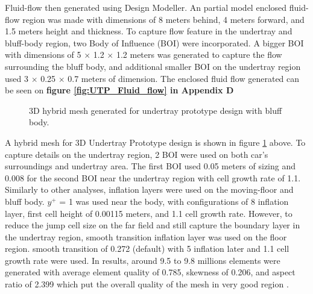  \noindent Fluid-flow then generated using Design Modeller. An partial model enclosed fluid-flow region was made with dimensions of 8 meters behind, 4 meters forward, and 1.5 meters height and thickness. To capture flow feature in the undertray and bluff-body region, two Body of Influence (BOI) were incorporated. A bigger BOI with dimensions of 5 $\times$ 1.2 $\times$ 1.2 meters was generated to capture the flow surrounding the bluff body, and additional smaller BOI on the undertray region used 3 $\times$ 0.25 $\times$ 0.7 meters of dimension. The enclosed fluid flow generated can be seen on \textbf{figure \ref{fig:UTP_Fluid_flow} in Appendix D}
 
 \begin{figure}[!htb] 
    \centering
    \noindent{}
    \caption{3D hybrid mesh generated for undertray prototype design with bluff body.}\label{fig:3D_UT_MESH}
\end{figure}

\noindent A hybrid mesh for 3D Undertray Prototype design is shown in figure \ref{fig:3D_UT_MESH} above. To capture details on the undertray region, 2 BOI were used on both car's surroundings and undertray area. The first BOI used 0.05 meters of sizing and 0.008 for the second BOI near the undertray region with cell growth rate of 1.1. Similarly to other analyses, inflation layers were used on the moving-floor and bluff body. $y^+$ = 1 was used near the body, with configurations of 8 inflation layer, first cell height of 0.00115 meters, and 1.1 cell growth rate. However, to reduce the jump cell size on the far field and still capture the boundary layer in the undertray region, smooth transition inflation layer was used on the floor region. smooth transition of 0.272 (default) with 5 inflation later and 1.1 cell growth rate were used. In results, around 9.5 to 9.8 millions elements were generated with average element quality of 0.785, skewness of 0.206, and aspect ratio of 2.399 which put the overall quality of the mesh in very good region \cite{Ansys2006ModelingFlows}.   

